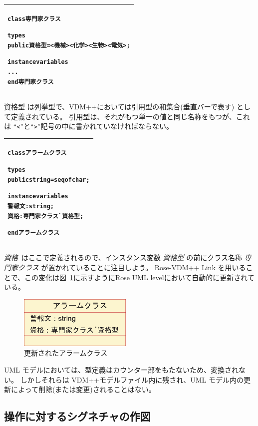 \documentclass[\pformat,12pt,twoside]{jarticle}
\newenvironment{VDMgray}%
{\begin{tabular}{|G|}\hline\small\begin{alltt}}%
{\end{alltt}\normalsize\\
 \hline\end{tabular}}
\begin{document}
\begin{VDMgray}
class 専門家クラス

types
 public 資格型 = \texttt{<}機械\texttt{>} {\textbar} \texttt{<}化学\texttt{>} {\textbar} \texttt{<}生物\texttt{>} {\textbar} \texttt{<}電気\texttt{>};

instance variables 
...
end 専門家クラス

\end{VDMgray}


資格型 は列挙型で、VDM++においては引用型の和集合(垂直バーで表す) として定義されている。
引用型は、それがもつ単一の値と同じ名称をもつが、これは ``\texttt{<}''と``\texttt{>}''記号の中に書かれていなければならない。

\begin{VDMgray}
class アラームクラス

types
 public string = seq of char;

instance variables 
 警報文 : string;
 資格 : 専門家クラス\`{}資格型;

end アラームクラス

\end{VDMgray}


\emph{資格}\ はここで定義されるので、インスタンス変数 \emph{資格型} の前にクラス名称 \emph{専門家クラス} が置かれていることに注目しよう。
Rose-VDM++ Link を用いることで、この変化は図~\ref{fig:updatedalarm}に示すようにRose UML levelにおいて自動的に更新されている。

\begin{figure}[htbp]
\begin{center}
\includegraphics[width=2.120in]{updatedalarm}
\caption{更新されたアラームクラス \label{fig:updatedalarm}}
\end{center}
\end{figure}

UML モデルにおいては、型定義はカウンター部をもたないため、変換されない。
しかしそれらは VDM++モデルファイル内に残され、UML モデル内の更新によって削除(または変更)されることはない。

\subsection{操作に対するシグネチャの作図}
\end{document}
